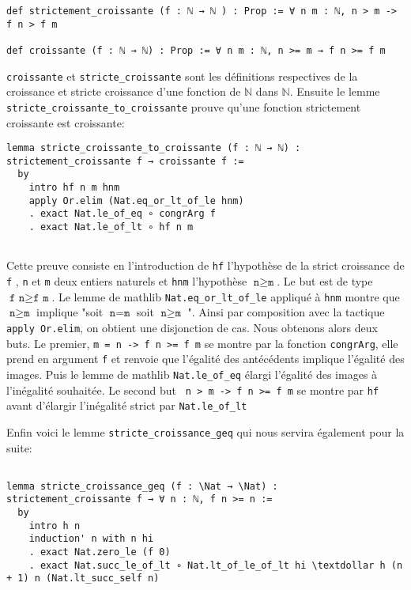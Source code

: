 \documentclass[a4paper, 12pt]{article}
\newcommand{\lean}[1]{\texttt{#1}}
\begin{document}
\begin{verbatim}
def strictement_croissante (f : ℕ → ℕ ) : Prop := ∀ n m : ℕ, n > m -> f n > f m

def croissante (f : ℕ → ℕ) : Prop := ∀ n m : ℕ, n >= m → f n >= f m

\end{verbatim}

\lean{croissante} et \lean{stricte_croissante} sont les définitions respectives de la croissance et stricte croissance d'une fonction de $\mathbb{N}$ dans $\mathbb{N}$. Ensuite le lemme \lean{stricte_croissante_to_croissante} prouve qu'une fonction strictement croissante est croissante:

\begin{verbatim}
lemma stricte_croissante_to_croissante (f : ℕ → ℕ) : strictement_croissante f → croissante f :=
  by
    intro hf n m hnm
    apply Or.elim (Nat.eq_or_lt_of_le hnm)
    . exact Nat.le_of_eq ∘ congrArg f
    . exact Nat.le_of_lt ∘ hf n m
    
\end{verbatim}



Cette preuve consiste en l'introduction de \lean{hf} l'hypothèse de la strict croissance de \lean{f} , \lean{n} et \lean{m} deux entiers naturels et \lean{hnm} l'hypothèse $ \lean{n} \geq \lean{m} $. Le but est de type $ \lean{f n} \geq \lean{f m} $. 
Le lemme de mathlib \lean{Nat.eq_or_lt_of_le} appliqué à \lean{hnm} montre que $ \lean{n} \geq \lean{m} $ implique "soit $ \lean{n} = \lean{m} $ soit $ \lean{n} \geq \lean{m} $ ". Ainsi par composition avec la tactique \lean{apply Or.elim}, on obtient une disjonction de cas. Nous obtenons alors deux buts. Le premier, \lean{m = n -> f n >=  f m}  se montre par la fonction \lean{congrArg}, elle prend en argument \lean{f} et renvoie que l'égalité des antécédents implique l'égalité des images.  Puis le lemme de mathlib \lean{Nat.le_of_eq} élargi l'égalité des images à l'inégalité souhaitée. Le second but \lean{ n > m -> f n >= f m} se montre par \lean{hf} avant d'élargir l'inégalité strict par \lean{Nat.le_of_lt}



Enfin voici le lemme \lean{stricte_croissance_geq} qui nous servira également pour la suite:

\begin{verbatim}

lemma stricte_croissance_geq (f : \Nat → \Nat) : strictement_croissante f → ∀ n : ℕ, f n >= n :=
  by
    intro h n
    induction' n with n hi
    . exact Nat.zero_le (f 0)
    . exact Nat.succ_le_of_lt ∘ Nat.lt_of_le_of_lt hi \textdollar h (n + 1) n (Nat.lt_succ_self n)
\end{verbatim}   
    
\end{document}
